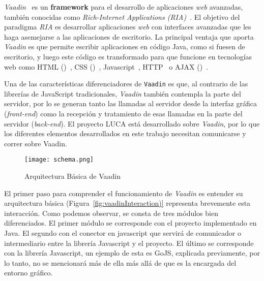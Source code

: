 \emph{Vaadin}~\cite{vaadin} es un \textbf{framework} para el desarrollo de aplicaciones \emph{web} avanzadas, también conocidas como \emph{Rich-Internet Applications (RIA)}~\cite{}. El objetivo del paradigma \emph{RIA} es desarrollar aplicaciones \emph{web} con interfaces avanzadas que les haga asemejarse a las aplicaciones de escritorio. La principal ventaja que aporta \emph{Vaadin} es que permite escribir aplicaciones en código Java, como si fuesen de escritorio, y luego este código es transformado para que funcione en tecnologías web como HTML ()~\cite{}, CSS ()~\cite{}, Javascript~\cite{}, HTTP~\cite{} o AJAX ()~\cite{}.

Una de las características diferenciadores de \texttt{Vaadin} es que, al contrario de las librerías de JavaScript tradicionales, \emph{Vaadin} también contempla la parte del servidor, por lo se generan tanto las llamadas al servidor desde la interfaz gráfica (\emph{front-end}) como la recepción y tratamiento de esas llamadas en la parte del servidor (\emph{back-end}). El proyecto LUCA está desarrollado sobre \emph{Vaadin}, por lo que los diferentes elementos desarrollados en este trabajo necesitan comunicarse y correr sobre Vaadin. 


\begin{figure}[!tb]
    \centering
	\texttt{[image: schema.png]}
	\caption{Arquitectura Básica de Vaadin}
\label{fig:schema}
\end{figure}

El primer paso para comprender el funcionamiento de \emph{Vaadin} es entender su arquitectura básica (Figura~\ref{fig:vaadinInteraction)} representa brevemente esta interacción. Como podemos observar, se consta de tres módulos bien diferenciados. El primer módulo se corresponde con el proyecto implementado en Java. El segundo con el conector en javascript que servirá de comunicador o intermediario entre la librería Javascript y el proyecto. El último se corresponde con la librería Javascript, un ejemplo de esta es GoJS, explicada previamente, por lo tanto, no se mencionará más de ella más allá de que es la encargada del entorno gráfico.

